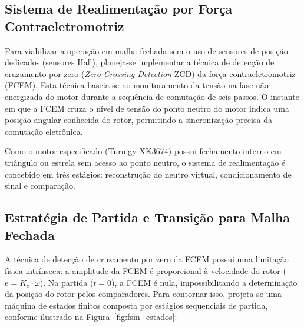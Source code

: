 \subsection{Sistema de Realimentação por Força Contraeletromotriz}
\label{subsec:condicionamento_sinais}

Para viabilizar a operação em malha fechada sem o uso de sensores de posição dedicados (sensores Hall), planeja-se implementar a técnica de detecção de cruzamento por zero (\textit{Zero-Crossing Detection} ZCD) da força contraeletromotriz (FCEM). Esta técnica baseia-se no monitoramento da tensão na fase não energizada do motor durante a sequência de comutação de seis passos. O instante em que a FCEM cruza o nível de tensão do ponto neutro do motor indica uma posição angular conhecida do rotor, permitindo a sincronização precisa da comutação eletrônica.

Como o motor especificado (Turnigy XK3674) possui fechamento interno em triângulo ou estrela sem acesso ao ponto neutro, o sistema de realimentação é concebido em três estágios: reconstrução do neutro virtual, condicionamento de sinal e comparação.

\subsection{Estratégia de Partida e Transição para Malha Fechada}

A técnica de detecção de cruzamento por zero da FCEM possui uma limitação física intrínseca: a amplitude da FCEM é proporcional à velocidade do rotor ($e = K_e \cdot \omega$). Na partida ($t=0$), a FCEM é nula, impossibilitando a determinação da posição do rotor pelos comparadores. Para contornar isso, projeta-se uma máquina de estados finitos composta por estágios sequenciais de partida, conforme ilustrado na Figura~\ref{fig:fsm_estados}:

